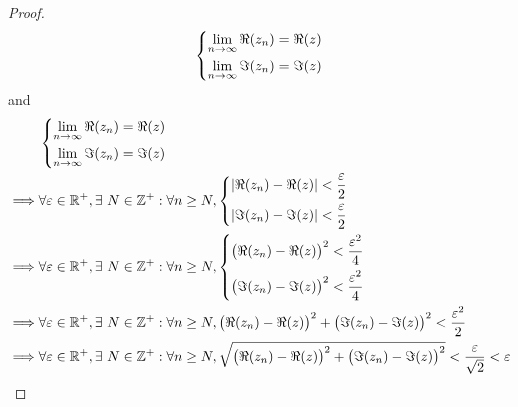 \begin{proof}
\begin{align*}
\begin{dcases}
                 \lim_{n \to \infty} \Re(z_n) = \Re(z) \\
                 \lim_{n \to \infty} \Im(z_n) = \Im(z)
               \end{dcases}
  \end{align*}
  and
  \begin{align*}
             & \begin{dcases}
                 \lim_{n \to \infty} \Re(z_n) = \Re(z) \\
                 \lim_{n \to \infty} \Im(z_n) = \Im(z)
               \end{dcases}                                                                                                                                                    \\
    \implies & \forall \varepsilon \in \R^+, \exists\ N \in \Z^+ : \forall n \geq N, \begin{dcases}
                                                                                       \abs{\Re(z_n) - \Re(z)} < \dfrac{\varepsilon}{2} \\
                                                                                       \abs{\Im(z_n) - \Im(z)} < \dfrac{\varepsilon}{2}
                                                                                     \end{dcases}                                                                   \\
    \implies & \forall \varepsilon \in \R^+, \exists\ N \in \Z^+ : \forall n \geq N, \begin{dcases}
                                                                                       \big(\Re(z_n) - \Re(z)\big)^2 < \dfrac{\varepsilon^2}{4} \\
                                                                                       \big(\Im(z_n) - \Im(z)\big)^2 < \dfrac{\varepsilon^2}{4}
                                                                                     \end{dcases}                           \\
    \implies & \forall \varepsilon \in \R^+, \exists\ N \in \Z^+ : \forall n \geq N, \big(\Re(z_n) - \Re(z)\big)^2 + \big(\Im(z_n) - \Im(z)\big)^2 < \dfrac{\varepsilon^2}{2}                           \\
    \implies & \forall \varepsilon \in \R^+, \exists\ N \in \Z^+ : \forall n \geq N, \sqrt{\big(\Re(z_n) - \Re(z)\big)^2 + \big(\Im(z_n) - \Im(z)\big)^2} < \dfrac{\varepsilon}{\sqrt{2}} < \varepsilon \\

\end{align*}
\end{proof}
